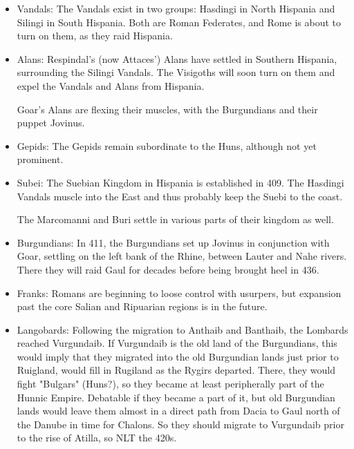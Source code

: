 \documentclass{article}
\begin{document}
\begin{itemize}
		\item Vandals:\newline
		The Vandals exist in two groups:  Hasdingi in North Hispania and Silingi in South Hispania.
		Both are Roman Federates, and Rome is about to turn on them, as they raid Hispania.
		
		\item Alans:\newline
		Respindal's (now Attaces') Alans have settled in Southern Hispania, surrounding the Silingi Vandals.
		The Visigoths will soon turn on them and expel the Vandals and Alans from Hispania.
		
		Goar's Alans are flexing their muscles, with the Burgundians and their puppet Jovinus.
		
		\item Gepids:\newline
		The Gepids remain subordinate to the Huns, although not yet prominent.
		
		\item Subei:\newline
		The Suebian Kingdom in Hispania is established in 409.
		The Hasdingi Vandals muscle into the East and thus probably keep the Suebi to the coast.
		
		The Marcomanni and Buri settle in various parts of their kingdom as well.
		
		\item Burgundians:\newline
		In 411, the Burgundians set up Jovinus in conjunction with Goar, settling on the left bank of the Rhine, between Lauter and Nahe rivers.
		There they will raid Gaul for decades before being brought heel in 436.
		
		\item Franks:\newline
		Romans are beginning to loose control with usurpers, but expansion past the core Salian and Ripuarian regions is in the future.
		
		\item Langobards:\newline
		Following the migration to Anthaib and Banthaib, the Lombards reached Vurgundaib.
		If Vurgundaib is the old land of the Burgundians, this would imply that they migrated into the old Burgundian lands just prior to Ruigland, would fill in Rugiland as the Rygirs departed.
		There, they would fight "Bulgars" (Huns?), so they became at least peripherally part of the Hunnic Empire.
		Debatable if they became a part of it, but old Burgundian lands would leave them almost in a direct path from Dacia to Gaul north of the Danube in time for Chalons.
		So they should migrate to Vurgundaib prior to the rise of Atilla, so NLT the 420s.
		

\end{itemize}
\end{document}
